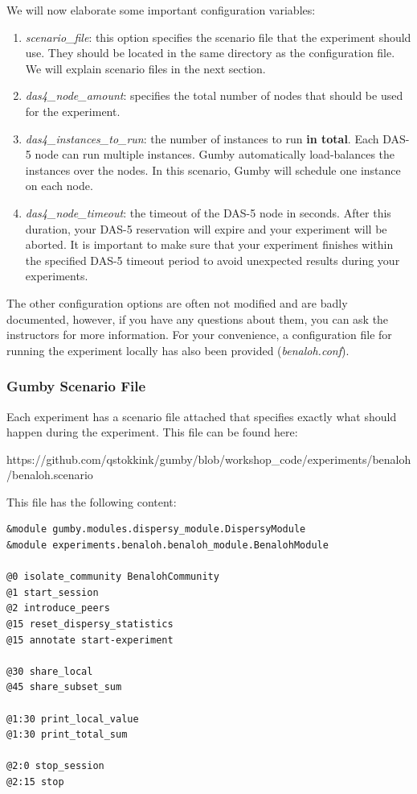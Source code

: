 \documentclass{article}
\begin{document}
We will now elaborate some important configuration variables:
\begin{enumerate}
	\item \emph{scenario\_file}: this option specifies the scenario file that the experiment should use. They should be located in the same directory as the configuration file. We will explain scenario files in the next section.
	\item \emph{das4\_node\_amount}: specifies the total number of nodes that should be used for the experiment.
	\item \emph{das4\_instances\_to\_run}: the number of instances to run \textbf{in total}. Each DAS-5 node can run multiple instances. Gumby automatically load-balances the instances over the nodes. In this scenario, Gumby will schedule one instance on each node.
	\item \emph{das4\_node\_timeout}: the timeout of the DAS-5 node in seconds. After this duration, your DAS-5 reservation will expire and your experiment will be aborted. It is important to make sure that your experiment finishes within the specified DAS-5 timeout period to avoid unexpected results during your experiments.
\end{enumerate}

The other configuration options are often not modified and are badly documented, however, if you have any questions about them, you can ask the instructors for more information.
For your convenience, a configuration file for running the experiment locally has also been provided (\emph{benaloh.conf}).

\subsubsection{Gumby Scenario File}
\label{sec:gumby_scenario}
Each experiment has a scenario file attached that specifies exactly what should happen during the experiment.
This file can be found here:

https://github.com/qstokkink/gumby/blob/workshop\_code/experiments/benaloh/benaloh.scenario

This file has the following content:

\begin{lstlisting}[frame=single]
&module gumby.modules.dispersy_module.DispersyModule
&module experiments.benaloh.benaloh_module.BenalohModule

@0 isolate_community BenalohCommunity
@1 start_session
@2 introduce_peers
@15 reset_dispersy_statistics
@15 annotate start-experiment

@30 share_local
@45 share_subset_sum

@1:30 print_local_value
@1:30 print_total_sum

@2:0 stop_session
@2:15 stop
\end{lstlisting}
\end{document}
